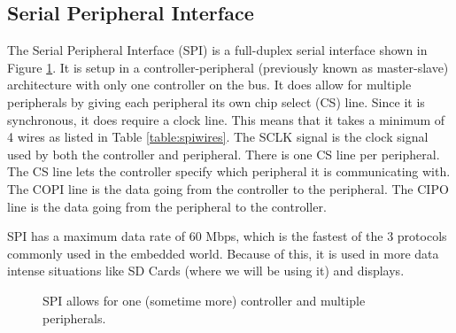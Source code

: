 \subsection{Serial Peripheral Interface}
The Serial Peripheral Interface (SPI) is a full-duplex serial interface shown in Figure \ref{fig:spi}. It is setup in a controller-peripheral 
(previously known as master-slave) architecture with only one controller on the bus. It does allow for multiple 
peripherals by giving each peripheral its own chip select (CS) line. Since it is synchronous, it does require a
clock line. This means that it takes a minimum of 4 wires as listed in Table \ref{table:spiwires}. The SCLK signal is the
clock signal used by both the controller and peripheral. There is one CS line per peripheral. The CS line lets the controller 
specify which peripheral it is communicating with. The COPI line is the data going from the controller to the peripheral. 
The CIPO line is the data going from the peripheral to the controller. 

SPI has a maximum data rate of 60 Mbps, which is the fastest of the 3 protocols commonly used in the embedded world. Because of 
this, it is used in more data intense situations like SD Cards (where we will be using it) and displays.

\begin{figure}[!htb]
	\centering
	\caption{SPI allows for one (sometime more) controller and multiple peripherals.}
	\label{fig:spi}
\end{figure}

